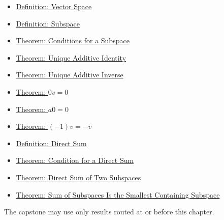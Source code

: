 \begin{dependencies}
\begin{itemize}
  \item \hyperref[def:vector-space]{Definition: Vector Space}
  \item \hyperref[def:subspace]{Definition: Subspace}
  \item \hyperref[thm:conditions-for-a-subspace]{Theorem: Conditions for a Subspace}
  \item \hyperref[thm:unique-additive-identity]{Theorem: Unique Additive Identity}
  \item \hyperref[thm:unique-additive-inverse]{Theorem: Unique Additive Inverse}
  \item \hyperref[thm:zero-scalar-times-vector]{Theorem: $0v=0$}
  \item \hyperref[thm:scalar-times-zero-vector]{Theorem: $a0=0$}
  \item \hyperref[thm:minus-one-times-vector]{Theorem: $(-1)v=-v$}
  \item \hyperref[def:direct-sum]{Definition: Direct Sum}
  \item \hyperref[thm:condition-for-direct-sum]{Theorem: Condition for a Direct Sum}
  \item \hyperref[thm:direct-sum-of-two-subspaces]{Theorem: Direct Sum of Two Subspaces}
  \item \hyperref[thm:sum-of-subspaces-smallest-containing]{Theorem: Sum of Subspaces Is the Smallest Containing Subspace}
\end{itemize}
\end{dependencies}

\begin{remark*}
The capstone may use only results routed at or before this chapter.
\end{remark*}
